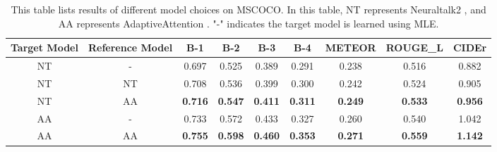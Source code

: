 \begin{table}
\small
\centering
\begin{tabular}{ccccccccc}
\toprule
    Target Model & Reference Model & B-1 & B-2 & B-3 & B-4 & METEOR & ROUGE\_L & CIDEr \\
\midrule
    NT & - & 0.697 & 0.525 & 0.389 & 0.291 & 0.238 & 0.516 & 0.882\\
    NT & NT & 0.708 & 0.536 & 0.399 & 0.300 & 0.242 & 0.524 & 0.905 \\
    NT & AA & \textbf{0.716} & \textbf{0.547} & \textbf{0.411} & \textbf{0.311} & \textbf{0.249} & \textbf{0.533} & \textbf{0.956} \\
\midrule
    AA & - & 0.733 & 0.572 & 0.433 & 0.327 & 0.260 & 0.540 & 1.042 \\
    AA & AA & \textbf{0.755} & \textbf{0.598} & \textbf{0.460} & \textbf{0.353} & \textbf{0.271} & \textbf{0.559} & \textbf{1.142} \\
\bottomrule
\end{tabular}
\vspace{1mm}
\caption{\small This table lists results of different model choices on MSCOCO.
In this table, NT represents Neuraltalk2 \cite{karpathy2015deep}, and AA represents AdaptiveAttention \cite{lu2016knowing}.
"-" indicates the target model is learned using MLE.}
\label{tab:modelchoice}
\vspace{-2mm} 
\end{table}
